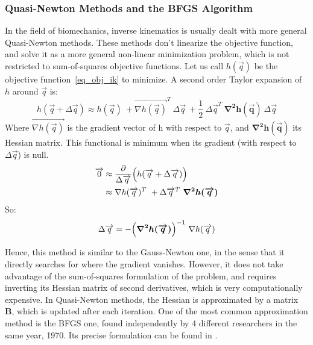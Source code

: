 \subsubsection{Quasi-Newton Methods and the BFGS Algorithm}

In the field of biomechanics, inverse kinematics is usually dealt with more general Quasi-Newton methods. These methods don't linearize the objective function, and solve it as a more general non-linear minimization problem, which is not restricted to sum-of-squares objective functions. 
Let us call $h(\overrightarrow{q})$ be the objective function~\ref{eq_obj_ik} to minimize. A second order Taylor expansion of $h$ around $\overrightarrow{q}$ is:
\begin{equation}
      h(\overrightarrow{q}+\Delta\overrightarrow{q}) 
      \approx h(\overrightarrow{q}) \ 
      + \overrightarrow{\nabla h(\overrightarrow{q})}^T  \ \Delta\overrightarrow{q} \ 
      + \frac{1}{2}  \ \Delta\overrightarrow{q}^T \ \bm{\nabla^2 h(\overrightarrow{q})}  \ \Delta\overrightarrow{q}
\end{equation} 
Where $\overrightarrow{\nabla h(\overrightarrow{q})}$ is the gradient vector of h with respect to $\overrightarrow{q}$, and $\bm{\nabla^2 h(\overrightarrow{q})}$ its Hessian matrix. This functional is minimum when its gradient (with respect to $\Delta\overrightarrow{q}$) is null.
\begin{equation}
    \begin{aligned}
      \overrightarrow{0} &\approx 
      \frac{\partial}{\Delta \overrightarrow{q}}
      \Bigl( h(\overrightarrow{q}+\Delta\overrightarrow{q}) \Bigr) \\
      &\approx
      \nabla h(\overrightarrow{q})^T  \  
      + \Delta\overrightarrow{q}^T \ \bm{\nabla^2 h(\overrightarrow{q})}
    \end{aligned}
\end{equation} 
So:
\begin{equation}
    \Delta\overrightarrow{q}
    = - \Bigl( \bm{\nabla^2 h(\overrightarrow{q})}\Bigr)^{-1} \ \nabla h(\overrightarrow{q})
\end{equation}      

Hence, this method is similar to the Gauss-Newton one, in the sense that it directly searches for where the gradient vanishes. However, it does not take advantage of the sum-of-squares formulation of the problem, and requires inverting its Hessian matrix of second derivatives, which is very computationally expensive. In Quasi-Newton methods, the Hessian is approximated by a matrix \textbf{B}, which is updated after each iteration. One of the most common approximation method is the BFGS one, found independently by 4 different researchers in the same year, 1970. Its precise formulation can be found in \cite{Nocedal1999}.

